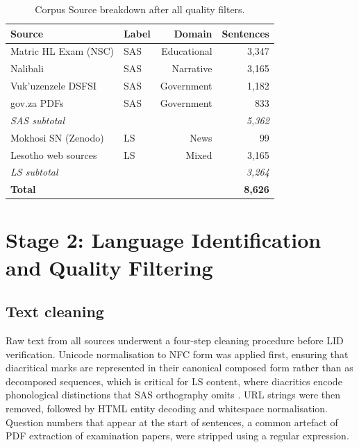 \documentclass[12pt]{ThesisRU}
\begin{document}
\begin{table}[ht]
    \centering
    \label{tab:corpus_sources}
    \caption{Corpus Source breakdown after all quality filters.}
    \begin{tabular}{llrr}
     \toprule
    \textbf{Source} & \textbf{Label} & \textbf{Domain} & \textbf{Sentences} \\
    \midrule
    Matric HL Exam (NSC)   & SAS & Educational  & 3,347 \\
    Nalibali               & SAS & Narrative    & 3,165 \\
    Vuk'uzenzele DSFSI     & SAS & Government   & 1,182 \\
    gov.za PDFs            & SAS & Government   &   833 \\
    \midrule
    \textit{SAS subtotal}  &     &              & \textit{5,362} \\
    \midrule
    Mokhosi SN (Zenodo)    & LS  & News         &    99 \\
    Lesotho web sources    & LS  & Mixed        & 3,165 \\
    \midrule
    \textit{LS subtotal}   &     &              & \textit{3,264} \\
    \midrule
    \textbf{Total}         &     &              & \textbf{8,626} \\
    \bottomrule
    \end{tabular}
\end{table}



\section{Stage 2: Language Identification and Quality Filtering}

\subsection{Text cleaning}

Raw text from all sources underwent a four-step cleaning procedure before LID verification. Unicode normalisation to NFC form was applied first, ensuring that diacritical marks are represented in their canonical composed form rather than as decomposed sequences, which is critical for LS content, where diacritics encode phonological distinctions that SAS orthography omits \citep{matlosa2017sesotho}. URL strings were then removed, followed by HTML entity decoding and whitespace normalisation. Question numbers that appear at the start of sentences, a common artefact of PDF extraction of examination papers, were stripped using a regular expression.
\end{document}
